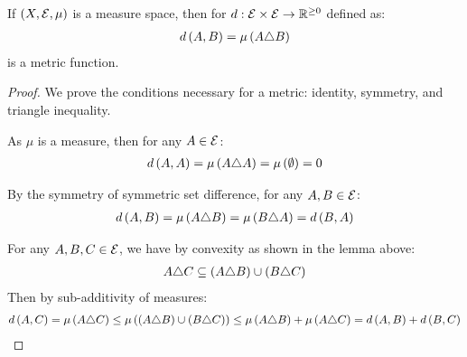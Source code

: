\begin{theorem}
  If \(\left(X, \mathcal{E}, \mu\right)\) is a measure space,
  then for \(d : \mathcal{E} \times \mathcal{E} \to \mathbb{R}^{\geq 0}\) defined as:
  \begin{align*}
    d\left(A, B\right) = \mu\left(A \triangle B\right)
  \end{align*}
  is a metric function.
\end{theorem}
\begin{proof}
  We prove the conditions necessary for a metric:
  identity, symmetry, and triangle inequality.

      As \(\mu\) is a measure, then for any \(A \in \mathcal{E}\):
      \begin{align*}
        d\left(A, A\right)
          = \mu\left(A \triangle A\right)
          = \mu\left(\emptyset\right) = 0
      \end{align*}

      By the symmetry of symmetric set difference,
      for any \(A, B \in \mathcal{E}\):
      \begin{align*}
        d\left(A, B\right)
          = \mu\left(A \triangle B\right)
          = \mu\left(B \triangle A\right)
          = d\left(B, A\right)
      \end{align*}

      For any \(A, B, C \in \mathcal{E}\),
      we have by convexity as shown in the lemma above:
      \begin{align*}
        A \triangle C \subseteq
          \left(A \triangle B\right) \cup \left(B \triangle C\right)
      \end{align*}
      Then by sub-additivity of measures:
      \begin{align*}
        d\left(A, C\right)
          = \mu\left(A \triangle C\right)
          \leq \mu\left(
                \left(A \triangle B\right) \cup \left(B \triangle C\right)\right)
          \leq
          \mu\left(A \triangle B\right) + \mu\left(A \triangle C\right)
          = d\left(A, B\right) + d\left(B, C\right)
      \end{align*}
\end{proof}




